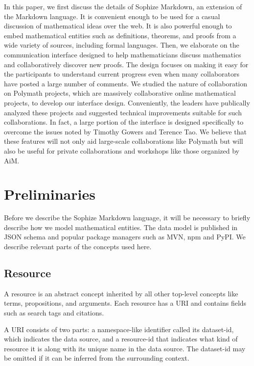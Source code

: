 \documentclass[a4paper]{article}
\begin{document}
In this paper, we first discuss the details of Sophize Markdown, an extension of the Markdown language. It is convenient enough to be used for a casual discussion of mathematical ideas over the web. It is also powerful enough to embed mathematical entities such as definitions, theorems, and proofs from a wide variety of sources, including formal languages. Then, we elaborate on the communication interface designed to help mathematicians discuss mathematics and collaboratively discover new proofs. The design focuses on making it easy for the participants to understand current progress even when many collaborators have posted a large number of comments. We studied the nature of collaboration on Polymath projects\cite{polymath_blog}, which are massively collaborative online mathematical projects, to develop our interface design. Conveniently, the leaders have publically analyzed these projects and suggested technical improvements suitable for such collaborations. In fact, a large portion of the interface is designed specifically to overcome the issues noted by Timothy Gowers \cite{gowers_weblog_2009} and Terence Tao\cite{whats_new_2009}. We believe that these features will not only aid large-scale collaborations like Polymath but will also be useful for private collaborations and workshops like those organized by AiM.

\section{Preliminaries}

Before we describe the Sophize Markdown language, it will be necessary to briefly describe how we model mathematical entities. The data model is published in JSON schema\cite{sophize_datamodel} and popular package managers such as MVN, npm and PyPI. We describe relevant parts of the concepts used here.

\subsection*{Resource}

A resource is an abstract concept inherited by all other top-level concepts like terms, propositions, and arguments. Each resource has a URI and contains fields such as search tags and citations.

A URI consists of two parts: a namespace-like identifier called its dataset-id, which indicates the data source, and a resource-id that indicates what kind of resource it is along with its unique name in the data source. The dataset-id may be omitted if it can be inferred from the surrounding context.
\end{document}
